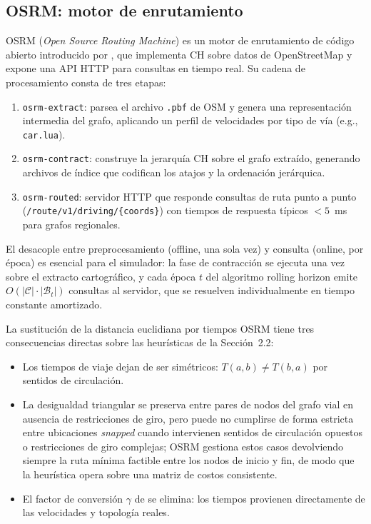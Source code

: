 \documentclass[12pt,letterpaper,oneside]{book}
\begin{document}
	\subsection{OSRM: motor de enrutamiento}

	OSRM (\textit{Open Source Routing Machine}) es un motor de
	enrutamiento de código abierto introducido por
	\citet{LuxenVetter2011}, que implementa CH sobre datos de
	OpenStreetMap y expone una API HTTP para consultas en tiempo real.
	Su cadena de procesamiento consta de tres etapas:

	\begin{enumerate}
		\item \texttt{osrm-extract}: parsea el archivo \texttt{.pbf} de OSM y
		      genera una representación intermedia del grafo, aplicando un perfil
		      de velocidades por tipo de vía (e.g., \texttt{car.lua}).
		\item \texttt{osrm-contract}: construye la jerarquía CH sobre el grafo
		      extraído, generando archivos de índice que codifican los atajos y
		      la ordenación jerárquica.
		\item \texttt{osrm-routed}: servidor HTTP que responde consultas de ruta
		      punto a punto \\(\texttt{/route/v1/driving/\{coords\}})
		      con tiempos de respuesta típicos $< 5$~ms para grafos regionales.
	\end{enumerate}

	El desacople entre preprocesamiento (offline, una sola vez) y consulta
	(online, por época) es esencial para el simulador: la fase de contracción
	se ejecuta una vez sobre el extracto cartográfico, y cada época $t$ del
	algoritmo rolling horizon emite $O(|\mathcal{C}| \cdot |\mathcal{B}_t|)$ consultas al
	servidor, que se resuelven individualmente en tiempo constante amortizado.

	La sustitución de la distancia euclidiana por tiempos OSRM tiene tres
	consecuencias directas sobre las heurísticas de la Sección~2.2:
	\begin{itemize}
		\item Los tiempos de viaje dejan de ser simétricos:
		      $T(a,b) \neq T(b,a)$ por sentidos de circulación.
		\item La desigualdad triangular se preserva entre pares de nodos
		      del grafo vial en ausencia de restricciones de giro, pero
		      puede no cumplirse de forma estricta entre ubicaciones
		      \emph{snapped} cuando intervienen sentidos de circulación
		      opuestos o restricciones de giro complejas; OSRM gestiona
		      estos casos devolviendo siempre la ruta mínima factible
		      entre los nodos de inicio y fin, de modo que la heurística
		      opera sobre una matriz de costos consistente.
		\item El factor de conversión $\gamma$ de \citet{Reyes2018} se elimina:
		      los tiempos provienen directamente de las velocidades y topología
		      reales.
	\end{itemize}
\end{document}
